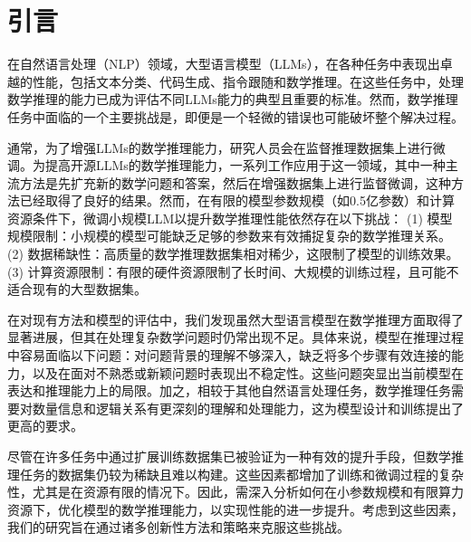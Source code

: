 \section{引言}
\label{sec:introduction}
在自然语言处理（NLP）领域，大型语言模型（LLMs）\citep{ouyang2022traininglanguagemodelsfollow, anil2023palm, raffel2023exploringlimitstransferlearning}，在各种任务中表现出卓越的性能，包括文本分类\citep{min-etal-2022-metaicl,pmlr-v202-jiang23k,devlin-etal-2019-bert}、代码生成\citep{wei2024magicoderempoweringcodegeneration}、指令跟随\citep{zhou2023instructionfollowingevaluationlargelanguage,lei2024instructercreformingemotionrecognition}和数学推理\citep{DBLP:conf/nips/Wei0SBIXCLZ22, taylor2022galacticalargelanguagemodel, lewkowycz2022solvingquantitativereasoningproblems}。在这些任务中，处理数学推理的能力已成为评估不同LLMs能力的典型且重要的标准\citep{cobbe2021training,hendrycks2021measuring}。然而，数学推理任务中面临的一个主要挑战是，即便是一个轻微的错误也可能破坏整个解决过程\citep{Lightman2023LetsVS}。

通常，为了增强LLMs的数学推理能力，研究人员会在监督推理数据集上进行微调。为提高开源LLMs的数学推理能力，一系列工作应用于这一领域，其中一种主流方法是先扩充新的数学问题和答案，然后在增强数据集上进行监督微调\citep{yuan2023scalingrelationshiplearningmathematical, luo2023wizardmathempoweringmathematicalreasoning, yu2024metamathbootstrapmathematicalquestions}，这种方法已经取得了良好的结果。然而，在有限的模型参数规模（如0.5亿参数）和计算资源条件下，微调小规模LLM以提升数学推理性能依然存在以下挑战：
(1) 模型规模限制：小规模的模型可能缺乏足够的参数来有效捕捉复杂的数学推理关系。
(2) 数据稀缺性：高质量的数学推理数据集相对稀少，这限制了模型的训练效果。
(3) 计算资源限制：有限的硬件资源限制了长时间、大规模的训练过程，且可能不适合现有的大型数据集。

在对现有方法和模型的评估中，我们发现虽然大型语言模型在数学推理方面取得了显著进展，但其在处理复杂数学问题时仍常出现不足。具体来说，模型在推理过程中容易面临以下问题：对问题背景的理解不够深入，缺乏将多个步骤有效连接的能力\citep{Huang_2024}，以及在面对不熟悉或新颖问题时表现出不稳定性。这些问题突显出当前模型在表达和推理能力上的局限。加之，相较于其他自然语言处理任务，数学推理任务需要对数量信息和逻辑关系有更深刻的理解和处理能力，这为模型设计和训练提出了更高的要求。

尽管在许多任务中通过扩展训练数据集已被验证为一种有效的提升手段\citep{tao2024survey}，但数学推理任务的数据集仍较为稀缺且难以构建。这些因素都增加了训练和微调过程的复杂性，尤其是在资源有限的情况下。因此，需深入分析如何在小参数规模和有限算力资源下，优化模型的数学推理能力，以实现性能的进一步提升。考虑到这些因素，我们的研究旨在通过诸多创新性方法和策略来克服这些挑战。

